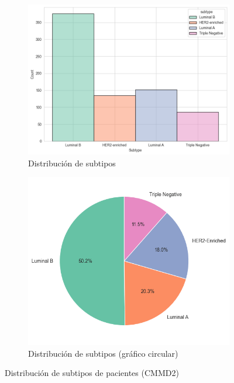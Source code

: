 \documentclass[a4paper,10pt]{book}
\begin{document}
\begin{figure}[h!]
\centering
\begin{subfigure}[t]{0.49\textwidth}
\centering
\includegraphics[width=\textwidth]{reports//assets/hist.png}
\caption{Distribución de subtipos}
\label{fig:subtype_hist}
\end{subfigure}
\begin{subfigure}[t]{0.49\textwidth}
\centering
\includegraphics[width=\textwidth]{reports/assets/pie.png}
\caption{Distribución de subtipos (gráfico circular)}
\label{fig:subtype_pie}
\end{subfigure}
\caption[Distribución de subtipos moleculares en CMMD2]{Distribución de subtipos de pacientes (CMMD2)}
\label{fig:subtype_charts}
\end{figure}
\end{document}
